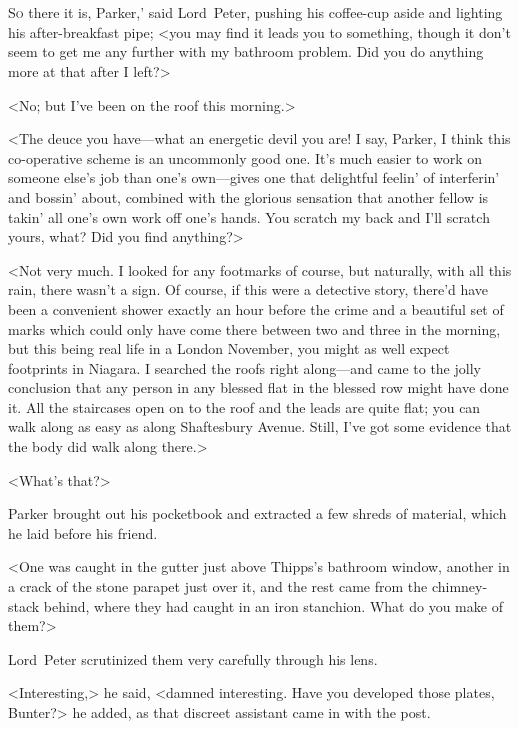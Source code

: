 \chapter[Chapter \thechapter]{}
\lettrine[lines=4,ante=‘—]{S}{o} there it is, Parker,' said Lord~Peter, pushing his coffee-cup aside and lighting his after-breakfast pipe; <you may find it leads you to something, though it don't seem to get me any further with my bathroom problem. Did you do anything more at that after I left?>

<No; but I've been on the roof this morning.>

<The deuce you have—what an energetic devil you are! I say, Parker, I think this co-operative scheme is an uncommonly good one. It's much easier to work on someone else's job than one's own—gives one that delightful feelin' of interferin' and bossin' about, combined with the glorious sensation that another fellow is takin' all one's own work off one's hands. You scratch my back and I'll scratch yours, what? Did you find anything?>

<Not very much. I looked for any footmarks of course, but naturally, with all this rain, there wasn't a sign. Of course, if this were a detective story, there'd have been a convenient shower exactly an hour before the crime and a beautiful set of marks which could only have come there between two and three in the morning, but this being real life in a London November, you might as well expect footprints in Niagara. I searched the roofs right along—and came to the jolly conclusion that any person in any blessed flat in the blessed row might have done it. All the staircases open on to the roof and the leads are quite flat; you can walk along as easy as along Shaftesbury Avenue. Still, I've got some evidence that the body did walk along there.>

<What's that?>

Parker brought out his pocketbook and extracted a few shreds of material, which he laid before his friend.

<One was caught in the gutter just above Thipps's bathroom window, another in a crack of the stone parapet just over it, and the rest came from the chimney-stack behind, where they had caught in an iron stanchion. What do you make of them?>

Lord~Peter scrutinized them very carefully through his lens.

<Interesting,> he said, <damned interesting. Have you developed those plates, Bunter?> he added, as that discreet assistant came in with the post.

